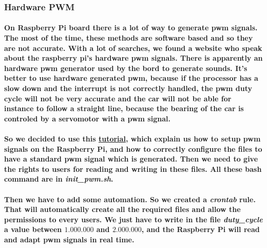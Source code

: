 \subsubsection{Hardware PWM}
\paragraph{On Raspberry Pi board there is a lot of way to generate pwm signals.
The most of the time, these methods are software based and so they are not
accurate. With a lot of searches, we found a website who speak about the
raspberry pi's hardware pwm signals. There is apparently an hardware pwm
generator used by the bord to generate sounds. It's better to use hardware 
generated pwm, because if the processor has a slow down and the interrupt
is not correctly handled, the pwm duty cycle will not be very accurate and
the car will not be able for instance to follow a straight line, because the
bearing of the car is controled by a servomotor with a pwm signal.}

\paragraph{So we decided to use this \href{https://disconnected.systems/blog/pi-zero-w-rover-setup/#moving-the-robot}{tutorial},
which explain us how to setup pwm signals on the Raspberry Pi,
and how to correctly configure the files to have a standard pwm signal
which is generated. Then we need to give the rights to users for reading and
writing in these files. All these bash command are in \textit{init\_pwm.sh}.
}

\paragraph{Then we have to add some automation. So we created a \textit{crontab}
rule. That will automatically create all the required files and allow the permissions
to every users. We just have to write in the file \textit{duty\_cycle} a value between
$1.000.000$ and $2.000.000$, and the Raspberry Pi will read and adapt pwm signals
in real time.
}